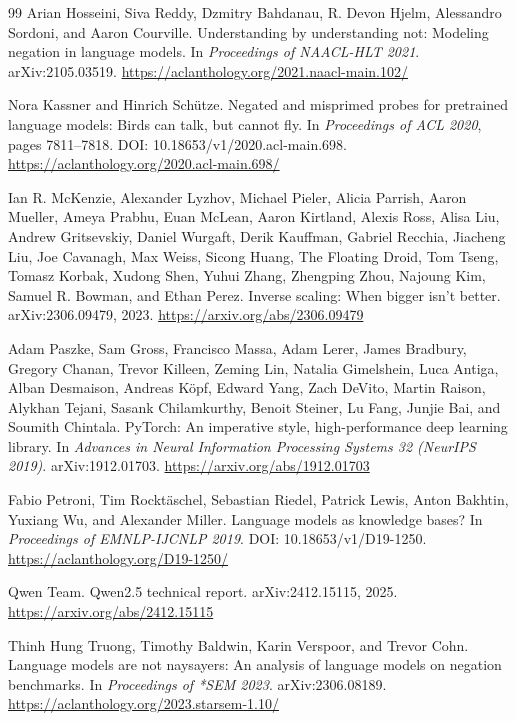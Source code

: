 \documentclass{article}
\begin{document}
\begin{thebibliography}{99}
Arian Hosseini, Siva Reddy, Dzmitry Bahdanau, R. Devon Hjelm, Alessandro Sordoni, and Aaron Courville.
Understanding by understanding not: Modeling negation in language models.
In \emph{Proceedings of NAACL-HLT 2021}. arXiv:2105.03519.
\url{https://aclanthology.org/2021.naacl-main.102/}

Nora Kassner and Hinrich Schütze.
Negated and misprimed probes for pretrained language models: Birds can talk, but cannot fly.
In \emph{Proceedings of ACL 2020}, pages 7811--7818. DOI: 10.18653/v1/2020.acl-main.698.
\url{https://aclanthology.org/2020.acl-main.698/}

Ian R. McKenzie, Alexander Lyzhov, Michael Pieler, Alicia Parrish, Aaron Mueller, Ameya Prabhu, Euan
McLean, Aaron Kirtland, Alexis Ross, Alisa Liu, Andrew Gritsevskiy, Daniel Wurgaft, Derik Kauffman,
Gabriel Recchia, Jiacheng Liu, Joe Cavanagh, Max Weiss, Sicong Huang, The Floating Droid, Tom Tseng,
Tomasz Korbak, Xudong Shen, Yuhui Zhang, Zhengping Zhou, Najoung Kim, Samuel R. Bowman, and Ethan
Perez.
Inverse scaling: When bigger isn't better.
arXiv:2306.09479, 2023. \url{https://arxiv.org/abs/2306.09479}

Adam Paszke, Sam Gross, Francisco Massa, Adam Lerer, James Bradbury, Gregory Chanan, Trevor Killeen,
Zeming Lin, Natalia Gimelshein, Luca Antiga, Alban Desmaison, Andreas Köpf, Edward Yang, Zach DeVito,
Martin Raison, Alykhan Tejani, Sasank Chilamkurthy, Benoit Steiner, Lu Fang, Junjie Bai, and Soumith
Chintala.
PyTorch: An imperative style, high-performance deep learning library.
In \emph{Advances in Neural Information Processing Systems 32 (NeurIPS 2019)}. arXiv:1912.01703.
\url{https://arxiv.org/abs/1912.01703}

Fabio Petroni, Tim Rocktäschel, Sebastian Riedel, Patrick Lewis, Anton Bakhtin, Yuxiang Wu, and
Alexander Miller.
Language models as knowledge bases?
In \emph{Proceedings of EMNLP-IJCNLP 2019}. DOI: 10.18653/v1/D19-1250.
\url{https://aclanthology.org/D19-1250/}

Qwen Team.
Qwen2.5 technical report.
arXiv:2412.15115, 2025. \url{https://arxiv.org/abs/2412.15115}

Thinh Hung Truong, Timothy Baldwin, Karin Verspoor, and Trevor Cohn.
Language models are not naysayers: An analysis of language models on negation benchmarks.
In \emph{Proceedings of *SEM 2023}. arXiv:2306.08189.
\url{https://aclanthology.org/2023.starsem-1.10/}


\end{thebibliography}
\end{document}
